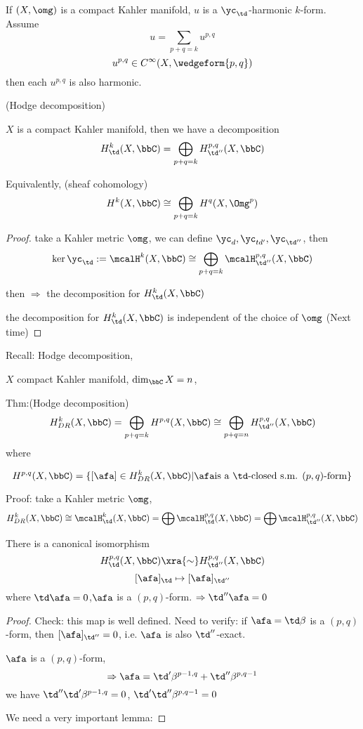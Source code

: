 \begin{cor}
If $(X,\omg)$ is a compact Kahler manifold,
$u$ is a $\yc_\td$-harmonic $k$-form. Assume
$$u=\sum_{p+q=k}u^{p,q}$$
$$u^{p,q}\in C^\infty(X,\wedgeform{p,q})$$
then each $u^{p,q}$ is also harmonic.
\end{cor}

\begin{thm}(Hodge decomposition)

$X$ is a compact Kahler manifold, then we have a decomposition
$$H_{\td}^k(X,\bbC)=\bigoplus_{p+q=k}H^{p,q}_{\td''}(X,\bbC)$$

Equivalently, (sheaf cohomology)
$$H^k(X,\bbC)\cong\bigoplus_{p+q=k}H^q(X,\Omg^p)$$
\end{thm}
\begin{proof}
take a Kahler metric $\omg$, we can define $\yc_d,\yc_{td'},\yc_{\td''}$,
then
$$\ker\yc_{\td}:=\mcalH^k(X,\bbC)
\cong\bigoplus\limits_{p+q=k}\mcalH^{p,q}_{\td''}(X,\bbC)$$

then $\Longrightarrow$ the decomposition for $H_\td^k(X,\bbC)$

the decomposition for $H^k_\td(X,\bbC)$ is independent of the choice of $\omg$
(Next time)
\end{proof}


Recall: Hodge decomposition,

$X$ compact Kahler manifold, $\dim_\bbC X=n$,

Thm:(Hodge decomposition)
$$H^k_{DR}(X,\bbC)=\bigoplus_{p+q=k}H^{p,q}(X,\bbC)
\cong\bigoplus_{p+q=n}H^{p,q}_{\td''}(X,\bbC)$$
where

$$H^{p,q}(X,\bbC)=\{[\afa]\in H_{DR}^k(X,\bbC)|\afa\text{is a $\td$-closed s.m. $(p,q)$-form}\}$$

Proof: take a Kahler metric $\omg$,
$$
H^k_{DR}(X,\bbC)
\cong
\mcalH_{\td}^k(X,\bbC)=\bigoplus\mcalH_\td^{p,q}(X,\bbC)
=\bigoplus\mcalH_{\td''}^{p,q}(X,\bbC)$$

\begin{prop}There is a canonical isomorphism
$$H^{p,q}_{\td}(X,\bbC)\xra{\sim}H^{p,q}_{\td''}(X,\bbC)$$
$$[\afa]_{\td}\mapsto[\afa]_{\td''}$$
where $\td\afa=0$,$\afa$ is a $(p,q)$-form.
$\Rightarrow \td''\afa=0$
\end{prop}
\begin{proof}
  Check: this map is well defined. Need to verify:
if $\afa=\td\beta$ is a $(p,q)$-form, then $[\afa]_{\td''}=0$,
i.e. $\afa$ is also $\td''$-exact.

$\afa$ is a $(p,q)$-form,
$$\Rightarrow\afa=\td'\beta^{p-1,q}+\td''\beta^{p,q-1}$$
we have $\td''\td'\beta^{p-1,q}=0$, $\td'\td''\beta^{p,q-1}=0$

We need a very important lemma:
\end{proof}

